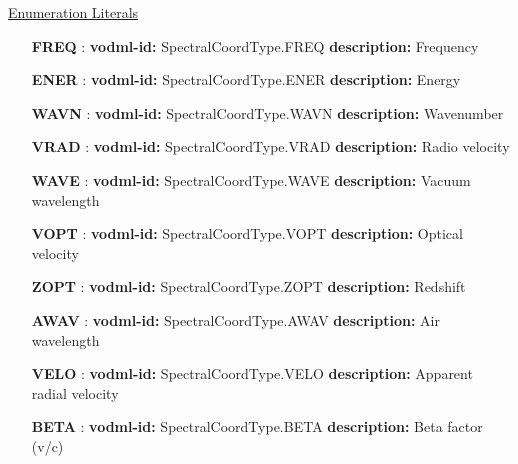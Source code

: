   \noindent \underline{Enumeration Literals}
  \vspace{-\parsep}
  \small
  \begin{itemize}
  
    \item[\textbf{FREQ}]: \textbf{vodml-id:} SpectralCoordType.FREQ \newline
          \textbf{description:} Frequency
    \item[\textbf{ENER}]: \textbf{vodml-id:} SpectralCoordType.ENER \newline
          \textbf{description:} Energy
    \item[\textbf{WAVN}]: \textbf{vodml-id:} SpectralCoordType.WAVN \newline
          \textbf{description:} Wavenumber
    \item[\textbf{VRAD}]: \textbf{vodml-id:} SpectralCoordType.VRAD \newline
          \textbf{description:} Radio velocity
    \item[\textbf{WAVE}]: \textbf{vodml-id:} SpectralCoordType.WAVE \newline
          \textbf{description:} Vacuum wavelength
    \item[\textbf{VOPT}]: \textbf{vodml-id:} SpectralCoordType.VOPT \newline
          \textbf{description:} Optical velocity
    \item[\textbf{ZOPT}]: \textbf{vodml-id:} SpectralCoordType.ZOPT \newline
          \textbf{description:} Redshift
    \item[\textbf{AWAV}]: \textbf{vodml-id:} SpectralCoordType.AWAV \newline
          \textbf{description:} Air wavelength
    \item[\textbf{VELO}]: \textbf{vodml-id:} SpectralCoordType.VELO \newline
          \textbf{description:} Apparent radial velocity
    \item[\textbf{BETA}]: \textbf{vodml-id:} SpectralCoordType.BETA \newline
          \textbf{description:} Beta factor (v/c)
  \end{itemize}
  \normalsize

